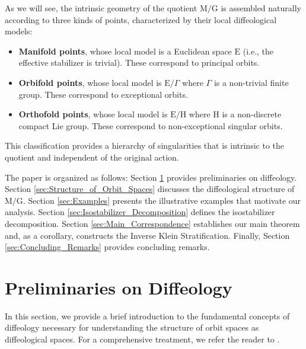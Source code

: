 \documentclass[10pt,reqno,letterpaper,twoside]{amsart}
\theoremstyle{article}
\def \E{\mathrm E}
\def \G{\mathrm G}
\def \H{\mathrm H}
\def \M{\mathrm M}
\def \H{\mathrm H} %
\begin{document}
  As we will see,
  the intrinsic geometry of the quotient $\M/\G$ is assembled naturally according to three kinds of points,
  characterized by their local diffeological models:
  \begin{itemize}
    \item \textbf{Manifold points}, whose local model is a Euclidean space $\E$ (i.e., the effective stabilizer is trivial).
    These correspond to principal orbits.
    \item \textbf{Orbifold points}, whose local model is $\E/\Gamma$ where $\Gamma$ is a non-trivial finite group.
    These correspond to exceptional orbits.
    \item \textbf{Orthofold points}, whose local model is $\E/\H$ where $\H$ is a non-discrete compact Lie group.
    These correspond to non-exceptional singular orbits.
  \end{itemize}
  This classification provides a hierarchy of singularities that is intrinsic to the quotient and independent of the original action.
  
  The paper is organized as follows:
  Section \ref{sec:Preliminaries} provides preliminaries on diffeology.
  Section \ref{sec:Structure_of_Orbit_Spaces} discusses the diffeological structure of $\M/\G$.
  Section \ref{sec:Examples} presents the illustrative examples that motivate our analysis.
  Section \ref{sec:Isostabilizer_Decomposition} defines the isostabilizer decomposition.
  Section \ref{sec:Main_Correspondence} establishes our main theorem and,
  as a corollary,
  constructs the Inverse Klein Stratification.
  Finally,
  Section \ref{sec:Concluding_Remarks} provides concluding remarks.
  
  
  \section{Preliminaries on Diffeology}
  \label{sec:Preliminaries}
  
  In this section,
  we provide a brief introduction to the fundamental concepts of diffeology necessary for understanding the structure of orbit spaces as diffeological spaces.
  For a comprehensive treatment,
  we refer the reader to \cite{PIZ13}.
  
  
\end{document}
